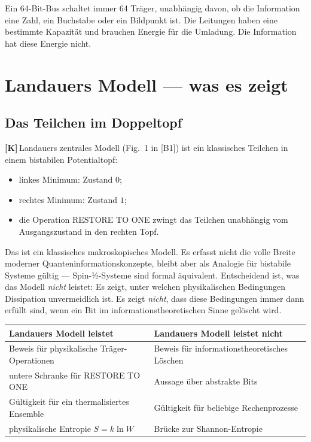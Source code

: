 \documentclass[11pt,a4paper]{article}
\newcommand{\LK}{\textcolor{layK}{\textbf{\footnotesize\textsf{[K]}}}\,}
\theoremstyle{ffgft}
\begin{document}
Ein 64-Bit-Bus schaltet immer 64 Träger, unabhängig davon, ob die Information eine
Zahl, ein Buchstabe oder ein Bildpunkt ist. Die Leitungen haben eine bestimmte
Kapazität und brauchen Energie für die Umladung. Die Information hat diese Energie
nicht.

\section{Landauers Modell --- was es zeigt}

\subsection{Das Teilchen im Doppeltopf}

\LK Landauers zentrales Modell (Fig.~1 in [B1]) ist ein klassisches Teilchen in
einem bistabilen Potentialtopf:

\begin{itemize}[leftmargin=1.4em,itemsep=0.2em]
  \item linkes Minimum: Zustand $0$;
  \item rechtes Minimum: Zustand $1$;
  \item die Operation \textup{RESTORE TO ONE} zwingt das Teilchen unabhängig vom
        Ausgangszustand in den rechten Topf.
\end{itemize}

Das ist ein klassisches makroskopisches Modell. Es erfasst nicht die volle Breite
moderner Quanteninformationskonzepte, bleibt aber als Analogie für bistabile
Systeme gültig --- Spin-½-Systeme sind formal äquivalent. Entscheidend ist, was
das Modell \emph{nicht} leistet: Es zeigt, unter welchen physikalischen
Bedingungen Dissipation unvermeidlich ist. Es zeigt \emph{nicht}, dass diese
Bedingungen immer dann erfüllt sind, wenn ein Bit im informationstheoretischen
Sinne gelöscht wird.

\begin{center}
\small
\begin{tabular}{@{}p{}p{}@{}}
\toprule
\textbf{Landauers Modell leistet} & \textbf{Landauers Modell leistet nicht} \\
\midrule
Beweis für physikalische Träger-Operationen & Beweis für informationstheoretisches Löschen \\
untere Schranke für \textup{RESTORE TO ONE} & Aussage über abstrakte Bits \\
Gültigkeit für ein thermalisiertes Ensemble & Gültigkeit für beliebige Rechenprozesse \\
physikalische Entropie $S = k\ln W$ & Brücke zur Shannon-Entropie \\
\bottomrule
\end{tabular}
\end{center}
\end{document}

